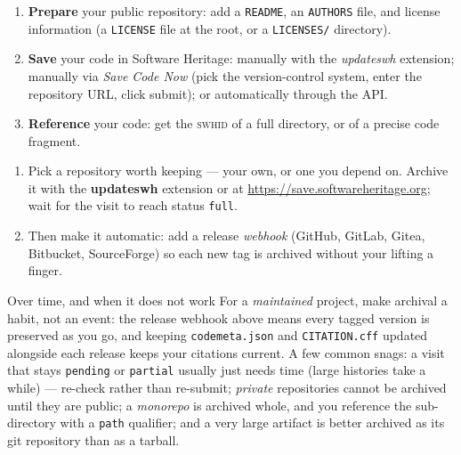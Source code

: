 \begin{tcolorbox}[colback=swhbg!35,colframe=swhdark,fonttitle=\bfseries\sffamily,
  coltitle=white,
  title={\href{https://www.softwareheritage.org/how-to-archive-reference-code/}{\textcolor{white}{The official HOWTO}}},
  sharp corners=downhill, boxrule=0.4pt,
  left=2.2mm,right=2.2mm,top=1mm,bottom=1mm]
\small
\begin{enumerate}[nosep,leftmargin=*]
  \item \textbf{Prepare} your public repository: add a \texttt{README}, an \texttt{AUTHORS} file,
        and license information (a \texttt{LICENSE} file at the root, or a \texttt{LICENSES/}
        directory).
  \item \textbf{Save} your code in Software Heritage: manually with the \emph{updateswh} extension;
        manually via \emph{Save Code Now} (pick the version-control system, enter the repository URL,
        click submit); or automatically through the API.
  \item \textbf{Reference} your code: get the \textsc{swhid} of a full directory, or of a precise
        code fragment.
\end{enumerate}
\end{tcolorbox}

\begin{handson}
\begin{enumerate}[nosep,leftmargin=*]
  \item Pick a repository worth keeping --- your own, or one you depend on. Archive it with the
        \textbf{updateswh} extension or at \url{https://save.softwareheritage.org}; wait for the
        visit to reach status \texttt{full}.
  \item Then make it automatic: add a release \emph{webhook} (GitHub, GitLab, Gitea, Bitbucket,
        SourceForge) so each new tag is archived without your lifting a finger.
\end{enumerate}
\end{handson}

\begin{callout}{Over time, and when it does not work}
For a \emph{maintained} project, make archival a habit, not an event: the release webhook above means
every tagged version is preserved as you go, and keeping \texttt{codemeta.json} and
\texttt{CITATION.cff} updated alongside each release keeps your citations current. A few common
snags: a visit that stays \texttt{pending} or \texttt{partial} usually just needs time (large
histories take a while) --- re-check rather than re-submit; \emph{private} repositories cannot be
archived until they are public; a \emph{monorepo} is archived whole, and you reference the
sub-directory with a \texttt{path} qualifier; and a very large artifact is better archived as its
git repository than as a tarball.
\end{callout}

